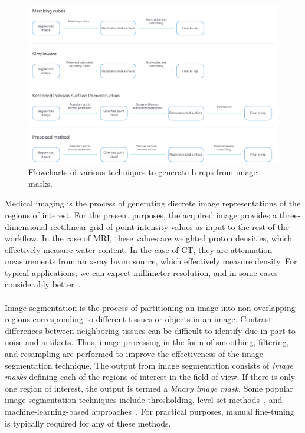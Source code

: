 \begin{figure}[]
	\centering
		\includegraphics[scale=0.25]{media/flowchart.pdf}
	\caption{Flowcharts of various techniques to generate b-reps from image masks.}
	\label{fig:flowchart}
\end{figure}\noindent



%
Medical imaging is the process of generating discrete image representations of the regions of interest. For the present purposes, the acquired image provides a three-dimensional rectilinear grid of point intensity values as input to the rest of the workflow. In the case of MRI, these values are weighted proton densities, which effectively measure water content. In the case of CT, they are attenuation measurements from an x-ray beam source, which effectively measure density. For typical applications, we can expect millimeter resolution, and in some cases considerably better~\cite{van2012super}.\\ \\
%
Image segmentation is the process of partitioning an image into non-overlapping regions corresponding to different tissues or objects in an image. Contrast differences between neighboring tissues can be difficult to identify due in part to noise and artifacts. Thus, image processing in the form of smoothing, filtering, and resampling are performed to improve the effectiveness of the image segmentation technique. The output from image segmentation consists of \textit{image masks} defining each of the regions of interest in the field of view. If there is only one region of interest, the output is termed a \textit{binary image mask}. Some popular image segmentation techniques include thresholding, level set methods~\cite{malladi_1995, sethian_1996}, and machine-learning-based approaches~\cite{litjens_2017}.  For practical purposes, manual fine-tuning is typically required for any of these methods.\\ \\






